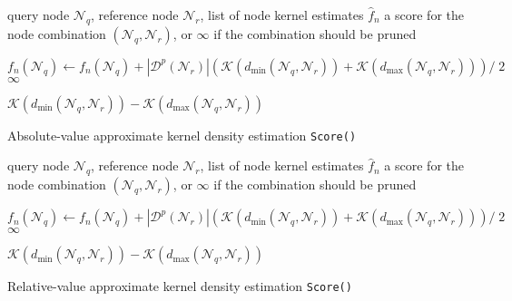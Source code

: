 \begin{algorithm}[tb]
  \begin{algorithmic}[1]
     query node $\mathscr{N}_q$, reference node
$\mathscr{N}_r$, list of node kernel estimates $\hat{f}_n$
     a score for the node combination $(\mathscr{N}_q,
\mathscr{N}_r)$, or $\infty$ if the combination should be pruned

    \medskip

      \STATE $f_n(\mathscr{N}_q) \gets f_n(\mathscr{N}_q) + |
\mathscr{D}^p(\mathscr{N}_r) | \left(\mathcal{K}(d_{\min}(\mathscr{N}_q,
\mathscr{N}_r)) + \mathcal{K}(d_{\max}(\mathscr{N}_q, \mathscr{N}_r))\right) /\;2$
      \RETURN $\infty$
    \ENDIF

    \RETURN $\mathcal{K}(d_{\min}(\mathscr{N}_q, \mathscr{N}_r)) -
\mathcal{K}(d_{\max}(\mathscr{N}_q, \mathscr{N}_r))$
  \end{algorithmic}

  \caption{Absolute-value approximate kernel density estimation
\texttt{Score()}}
  \label{alg:kde_score}
\end{algorithm}

\begin{algorithm}[tb]
  \begin{algorithmic}[1]
     query node $\mathscr{N}_q$, reference node
$\mathscr{N}_r$, list of node kernel estimates $\hat{f}_n$
     a score for the node combination $(\mathscr{N}_q,
\mathscr{N}_r)$, or $\infty$ if the combination should be pruned

    \medskip

      \STATE $f_n(\mathscr{N}_q) \gets f_n(\mathscr{N}_q) + |
\mathscr{D}^p(\mathscr{N}_r) | \left(\mathcal{K}(d_{\min}(\mathscr{N}_q,
\mathscr{N}_r)) + \mathcal{K}(d_{\max}(\mathscr{N}_q, \mathscr{N}_r))\right) /\;2$
      \RETURN $\infty$
    \ENDIF

    \RETURN $\mathcal{K}(d_{\min}(\mathscr{N}_q, \mathscr{N}_r)) -
\mathcal{K}(d_{\max}(\mathscr{N}_q, \mathscr{N}_r))$
  \end{algorithmic}

  \caption{Relative-value approximate kernel density estimation
\texttt{Score()}}
  \label{alg:kde_rva_score}
\end{algorithm}


